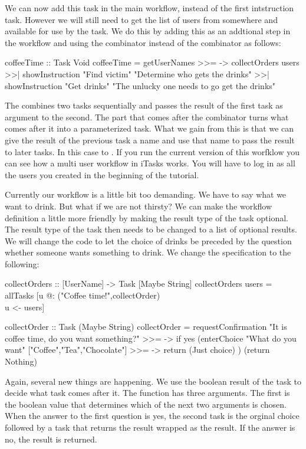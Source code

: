 \documentclass[a4paper,11pt]{article}
\begin{document}
We can now add this task in the main workflow, instead of the first intstruction task. However we will still need to get the list of users from somewhere and available for use by the  task. We do this by adding this as an addtional step in the workflow and using the \CleanInline{>>=} combinator instead of the \CleanInline{>>|} combinator as follows:
\begin{CleanCodeN}
coffeeTime :: Task Void
coffeeTime
  =   getUserNames
  >>= \users ->
      collectOrders users
  >>| showInstruction "Find victim" "Determine who gets the drinks"
  >>| showInstruction "Get drinks" "The unlucky one needs to go get the drinks"
\end{CleanCodeN}
The \CleanInline{>>=} combines two tasks sequentially and passes the result of the first task as argument to the second. The \CleanInline{\\users ->} part that comes after the \CleanInline{>>=} combinator turns what comes after it into a parameterized task. What we gain from this is that we can give the result of the previous task a name and use that name to pass the result to later tasks. In this case to . If you run the current version of this worfklow you can see how a multi user workflow in iTasks works. You will have to log in as all the users you created in the beginning of the tutorial.

Currently our workflow is a little bit too demanding. We have to say what we want to drink. But what if we are not thirsty? We can make the workflow definition a little more friendly by making the result type of the  task optional. The result type of the  task then needs to be changed to a list of optional results. We will change the code to let the choice of drinks be preceded by the question whether someone wants something to drink. We change the specification to the following:
\begin{CleanCodeN}
collectOrders :: [UserName] -> Task [Maybe String] 
collectOrders users = allTasks [u @: ("Coffee time!",collectOrder) \\ u <- users]

collectOrder :: Task (Maybe String)
collectOrder
    =   requestConfirmation "It is coffee time, do you want something?"
    >>= \yes -> if yes
        (enterChoice "What do you want" ["Coffee","Tea","Chocolate"]
         >>= \choice -> return (Just choice)
        )
        (return Nothing)
\end{CleanCodeN}
Again, several new things are happening. We use the boolean result of the  task to decide what task comes after it.
The  function has three arguments. The first is the boolean value that determines which of the next two arguments is chosen. When the answer to the first question is yes, the second task is the orginal choice followed by a task that returns the result wrapped as  the result. If the answer is no, the result  is returned.
\end{document}
